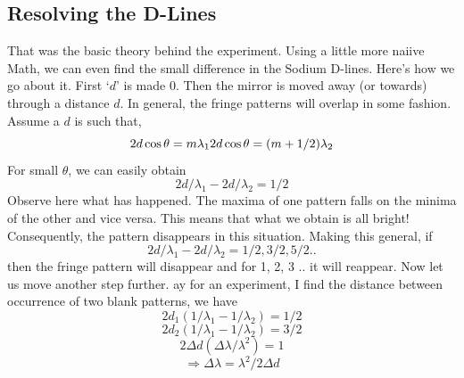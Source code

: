 	\subsection{Resolving the D-Lines}
		That was the basic theory behind the experiment. Using a little more naiive Math, we can even find the small difference in the Sodium D-lines. Here's how we go about it. First `$d$' is made 0. Then the mirror is moved away (or towards) through a distance $d$. In general, the fringe patterns will overlap in some fashion. Assume a $d$ is such that,
		\begin{equation}
			2d\cos{\theta}=m\lambda_1 \\
			2d\cos{\theta}=(m+1/2)\lambda_2
		\end{equation}
		For small $\theta$, we can easily obtain
		\begin{equation}
			2d/\lambda_1 - 2d/\lambda_2 = 1/2
		\end{equation}
		Observe here what has happened. The maxima of one pattern falls on the minima of the other and vice versa. This means that what we obtain is all bright! Consequently, the pattern disappears in this situation. Making this general, if
		\begin{equation}
			2d/\lambda_1 - 2d/\lambda_2 = 1/2, 3/2, 5/2 ..
		\end{equation}
		then the fringe pattern will disappear and for 1, 2, 3 .. it will reappear. Now let us move another step further. ay for an experiment, I find the distance between occurrence of two blank patterns, we have
		\begin{equation}
			2d_1 (1/\lambda_1 - 1/\lambda_2) = 1/2
		\end{equation}
		\begin{equation}
			2d_2 (1/\lambda_1 - 1/\lambda_2) = 3/2
		\end{equation}
		\begin{equation}
			2\Delta d (\Delta \lambda / \lambda^2) = 1
		\end{equation}
		\begin{equation}
			\Rightarrow \Delta \lambda = \lambda^2/2\Delta d
		\end{equation}


